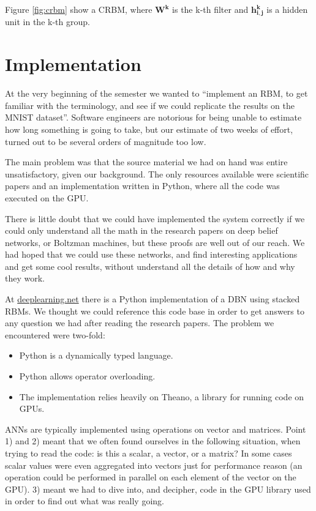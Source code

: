 \documentclass[11pt]{article}
\begin{document}
\newpage

Figure \ref{fig:crbm} show a CRBM, where $\mathbf{W^k}$ is the k-th filter and $\mathbf{h^k_{i,j}}$ is a hidden unit in the k-th group.

\section{Implementation}

At the very beginning of the semester we wanted to ``implement an RBM, to get familiar with the terminology, and see if we could replicate the results on the MNIST dataset''.  Software engineers are notorious for being unable to estimate how long something is going to take, but our estimate of two weeks of effort, turned out to be several orders of magnitude too low.

The main problem was that the source material we had on hand was entire unsatisfactory, given our background.  The only resources available were scientific papers and an implementation written in Python, where all the code was executed on the GPU.

There is little doubt that we could have implemented the system correctly if we could only understand all the math in the research papers on deep belief networks, or Boltzman machines, but these proofs are well out of our reach.  We had hoped that we could use these networks, and find interesting applications and get some cool results, without understand all the details of how and why they work.

At \href{http://deeplearning.net/tutorial}{deeplearning.net} there is a Python implementation of a DBN using stacked RBMs.  We thought we could reference this code base in order to get answers to any question we had after reading the research papers.  The problem we encountered were two-fold:

\begin{itemize}
 \item Python is a dynamically typed language.
 \item Python allows operator overloading.
 \item The implementation relies heavily on Theano, a library for running code on GPUs.
\end{itemize}

ANNs are typically implemented using operations on vector and matrices.  Point 1) and 2) meant that we often found ourselves in the following situation, when trying to read the code: is this a scalar, a vector, or a matrix?  In some cases scalar values were even aggregated into vectors just for performance reason (an operation could be performed in parallel on each element of the vector on the GPU).  3) meant we had to dive into, and decipher, code in the GPU library used in order to find out what was really going.
\end{document}
